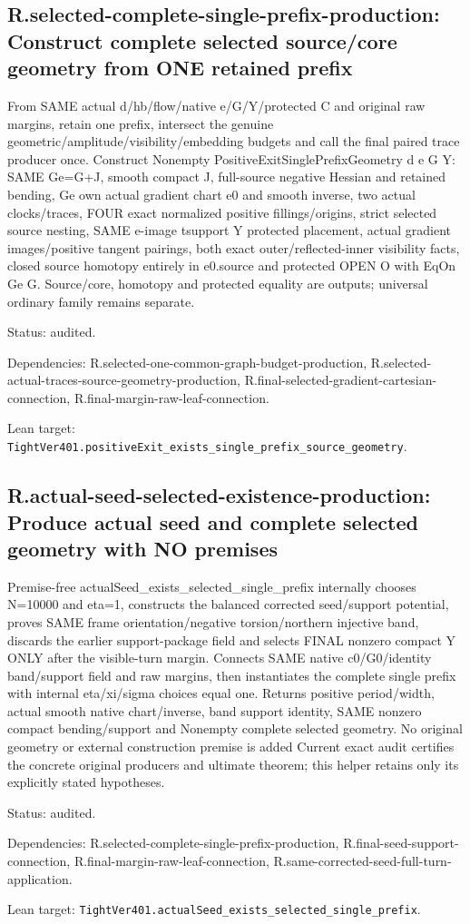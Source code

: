\documentclass{article}
\begin{document}
\subsection*{R.selected-complete-single-prefix-production: Construct complete selected source/core geometry from ONE retained prefix}
From SAME actual d/hb/flow/native e/G/Y/protected C and original raw margins, retain one prefix, intersect the genuine geometric/amplitude/visibility/embedding budgets and call the final paired trace producer once. Construct Nonempty PositiveExitSinglePrefixGeometry d e G Y: SAME Ge=G+J, smooth compact J, full-source negative Hessian and retained bending, Ge own actual gradient chart e0 and smooth inverse, two actual clocks/traces, FOUR exact normalized positive fillings/origins, strict selected source nesting, SAME e-image tsupport Y protected placement, actual gradient images/positive tangent pairings, both exact outer/reflected-inner visibility facts, closed source homotopy entirely in e0.source and protected OPEN O with EqOn Ge G. Source/core, homotopy and protected equality are outputs; universal ordinary family remains separate.
\par Status: audited.
\par Dependencies: R.selected-one-common-graph-budget-production, R.selected-actual-traces-source-geometry-production, R.final-selected-gradient-cartesian-connection, R.final-margin-raw-leaf-connection.
\par Lean target: \texttt{TightVer401.positiveExit\_exists\_single\_prefix\_source\_geometry}.
\subsection*{R.actual-seed-selected-existence-production: Produce actual seed and complete selected geometry with NO premises}
Premise-free actualSeed\_exists\_selected\_single\_prefix internally chooses N=10000 and eta=1, constructs the balanced corrected seed/support potential, proves SAME frame orientation/negative torsion/northern injective band, discards the earlier support-package field and selects FINAL nonzero compact Y ONLY after the visible-turn margin. Connects SAME native c0/G0/identity band/support field and raw margins, then instantiates the complete single prefix with internal eta/xi/sigma choices equal one. Returns positive period/width, actual smooth native chart/inverse, band support identity, SAME nonzero compact bending/support and Nonempty complete selected geometry. No original geometry or external construction premise is added Current exact audit certifies the concrete original producers and ultimate theorem; this helper retains only its explicitly stated hypotheses.
\par Status: audited.
\par Dependencies: R.selected-complete-single-prefix-production, R.final-seed-support-connection, R.final-margin-raw-leaf-connection, R.same-corrected-seed-full-turn-application.
\par Lean target: \texttt{TightVer401.actualSeed\_exists\_selected\_single\_prefix}.
\end{document}

